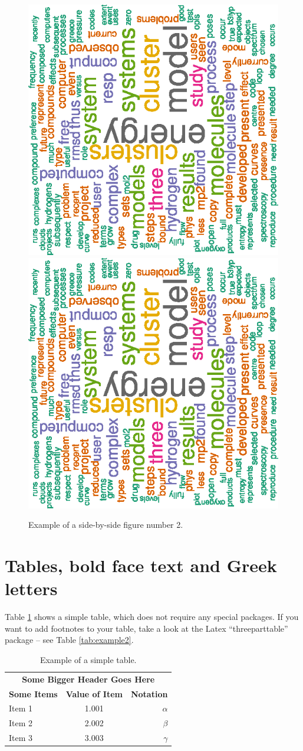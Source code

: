 \documentclass{article}
\begin{document}
\begin{figure}[h!]
  \centering
  \includegraphics[width=0.30\linewidth]{papers_2010_2015}
  \hspace{1cm} %
  \includegraphics[width=0.30\linewidth]{papers_2010_2015}
  \caption{Example of a side-by-side figure number 2.}
  \label{fig:example2}
\end{figure}

\section{Tables, bold face text and Greek letters}

Table \ref{tab:example1} shows a simple table, which does not require any special packages. If you want to add footnotes to your table, take a look at the Latex ``threeparttable'' package -- see Table \ref{tab:example2}.

\begin{table}[h!]
  \centering
  \caption{Example of a simple table.}
  \label{tab:example1}
  \normalsize  %
  \begin{tabular}{l|cr}
      \hline \hline
      \multicolumn{3}{c}{\textbf{Some Bigger Header Goes Here}} \\
      \textbf{Some Items} & \textbf{Value of Item} & \textbf{Notation} \\
      \hline
      Item 1 & 1.001 & $\alpha$ \\
      Item 2 & 2.002 & $\beta$ \\
      Item 3 & 3.003 & $\gamma$ \\
      \hline \hline
  \end{tabular}
\end{table}
\end{document}
